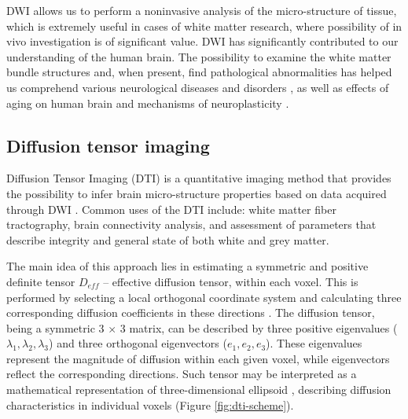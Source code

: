 \documentclass[thesis.tex]{subfiles}
\begin{document}
DWI allows us to perform a noninvasive analysis of the micro-structure of tissue, which is extremely useful in cases of white matter research, where possibility of in vivo investigation is of significant value. DWI has significantly contributed to our understanding of the human brain. The possibility to examine the white matter bundle structures and, when present, find pathological abnormalities has helped us comprehend various neurological diseases and disorders \cite{dwiDiseases, ChanraudDTI, dtiGeneralGood}, as well as effects of aging on human brain \cite{moseleyAging} and mechanisms of neuroplasticity \cite{Tournier2004FODdeconv, dwiDiseases}.

\subsection{Diffusion tensor imaging}
Diffusion Tensor Imaging (DTI) is a quantitative imaging method that provides the possibility to infer brain micro-structure properties based on data acquired through DWI \cite{BasserHow}. Common uses of the DTI include: white matter fiber tractography, brain connectivity analysis, and assessment of parameters that describe integrity and general state of both white and grey matter.



The main idea of this approach lies in estimating a symmetric and positive definite tensor $D_{eff}$ -- effective diffusion tensor, within each voxel. This is performed by selecting a local orthogonal coordinate system and calculating three corresponding diffusion coefficients in these directions \cite{Basser1994DTI}. The diffusion tensor, being a symmetric 3 $\times$ 3 matrix, can be described by three positive eigenvalues ($\lambda_1, \lambda_2, \lambda_3$) and three orthogonal eigenvectors ($e_1, e_2, e_3$). These eigenvalues represent the magnitude of diffusion within each given voxel, while eigenvectors reflect the corresponding directions. Such tensor may be interpreted as a mathematical representation of three-dimensional ellipsoid \cite{Basser1995InferringMF}, describing diffusion characteristics in individual voxels (Figure \ref{fig:dti-scheme}).
\end{document}
